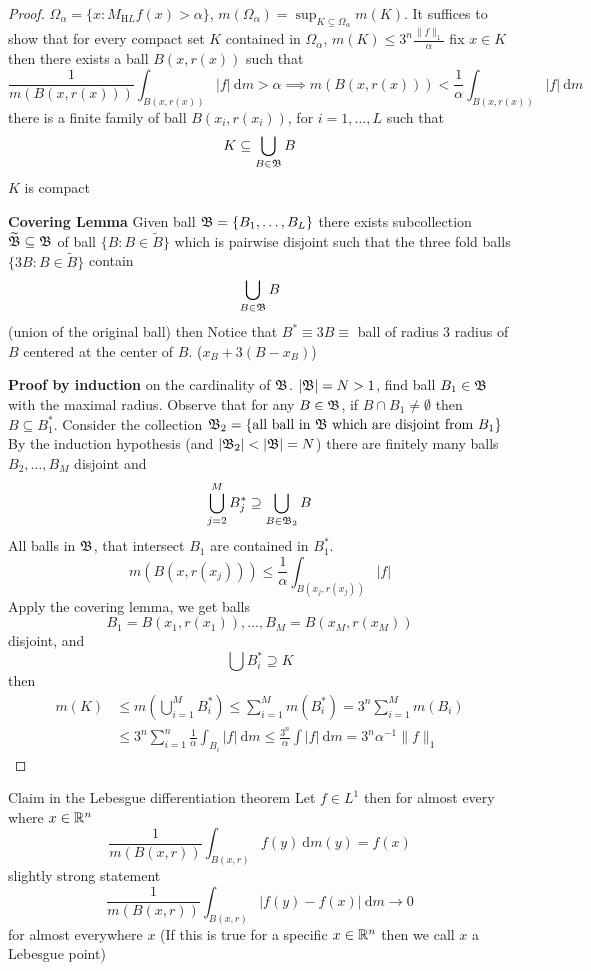 \begin{proof}
  $\Omega_\alpha = \{x : M_{\mathrm HL}f(x) > \alpha\}$,
  $m(\Omega_\alpha) = \sup_{K \subseteq \Omega_\alpha} m(K)$.
  It suffices to show that for every compact set $K$ contained in $\Omega_\alpha$, 
  $m(K) \le 3^n \frac{\|f\|_1}\alpha$
  fix $x \in K$ then there exists a ball $B(x, r(x))$ such that 
  \[\frac1{m(B(x, r(x)))} \int_{B(x, r(x))} |f| \ \mathrm{d}m> \alpha \implies m(B(x, r(x))) < \frac1\alpha\int_{{B(x, r(x))}} |f| \ \mathrm dm\]
  there is a finite family of ball $B(x_i, r(x_i))$, for $i = 1, \dotsc, L$ such that 
  \[K \subseteq \bigcup_{B \in \mathfrak B} B\]
  $K$ is compact

  \textbf{Covering Lemma} Given ball $\mathfrak B = \{B_1, \dotsc, B_L\}$ there exists subcollection $\widetilde{\mathfrak B} \subseteq \mathfrak B$
  of ball $\{B : B \in \widetilde{B}\}$ which is pairwise disjoint such that the three fold balls
  $\{3B : B \in \widetilde{B}\}$ contain 
  \[\bigcup_{B \in \mathfrak B} B\]
  (union of the original ball) then
  Notice that $B^* \equiv 3B\equiv$ ball of radius 3 radius of $B$ centered at the center of $B$.
  ($x_B + 3(B - x_B)$) 

  \textbf{Proof by induction} on the cardinality of $\mathfrak B$. $|\mathfrak B| = N > 1$,
  find ball $B_1 \in \mathfrak B$ with the maximal radius. Observe that for any $B \in \mathfrak B$, if $B \cap B_1 \neq \emptyset$
  then $B \subseteq B_1^*$.
  Consider the collection $\mathfrak B_{2} = \{\text{all ball in } \mathfrak B \text{ which are disjoint from }B_1\}$
  By the induction hypothesis (and $|\mathfrak B_2| < |\mathfrak B| = N$)
  there are finitely many balls $B_2, \dotsc, B_M$ disjoint and 
  \[\bigcup_{j=2}^M B_j^* \supseteq \bigcup_{B \in \mathfrak B_2}B\]
  All balls in $\mathfrak B$, that intersect $B_1$ are contained in $B_1^*$.
  \[m(B(x, r(x_j))) \le \frac1\alpha \int_{B(x_j, r(x_j))} |f|\]
  Apply the covering lemma, we get balls
  \[B_1 = B(x_1, r(x_1)), \dotsc, B_M = B(x_M, r(x_M))\]
  disjoint, and 
  \[\bigcup B_i^* \supseteq K\]
  then 
  \begin{align*}
    m(K) &\le m\left(\bigcup_{i=1}^M B_i^*\right) 
    \le \sum_{i=1}^M m(B_i^*)  = 3^n \sum_{i=1}^Mm(B_i) \\
    &\le 3^n\sum_{i=1}^n\frac1\alpha \int_{B_i} |f| \ \mathrm{d}m\le \frac{3^n}\alpha \int|f|\ \mathrm{d}m = 3^n\alpha^{-1}\|f\|_{1}
  \end{align*}
\end{proof}

Claim in the Lebesgue differentiation theorem
Let $f \in L^1$ then for almost every where $x \in \mathbb R^n$ 
\[\frac1{m(B(x, r))}\int_{B(x, r)} f(y) \ \mathrm{d}m(y) = f(x)\]
slightly strong statement
\[\frac1{m(B(x, r))}\int_{B(x, r)} |f(y) - f(x)| \ \mathrm{d}m \to 0\]
for almost everywhere $x$ (If this is true for a specific $x \in \mathbb R^n$ then we call $x$ a Lebesgue point)

